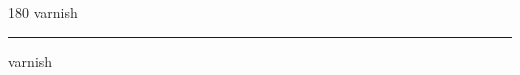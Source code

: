 
\begin{frame}
\begin{center}
\begin{turn}{180}
{\fontsize{2.5cm}{1em}\selectfont varnish}
\end{turn}
\vspace{1em}\par  
\hrule
\vspace{1em}\par  
{\fontsize{2.5cm}{1em}\selectfont varnish}
\end{center}
\end{frame}
